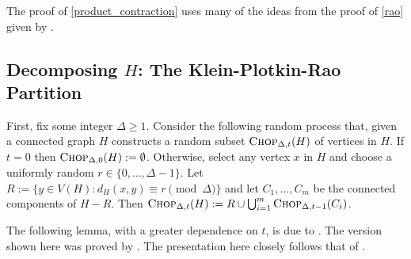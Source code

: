 \documentclass{patmorin}
\renewcommand{\ge}{\geqslant}
\newcommand{\david}[1]{{\color{orange} David: #1}}
\begin{document}

The proof of \cref{product_contraction} uses many of the ideas from the proof of \cref{rao} given by \citet{rao:small}.







\subsection{Decomposing $H$: The Klein-Plotkin-Rao Partition}

First, fix some integer $\Delta \ge 1$.
Consider the following random process that, given a connected graph $H$ constructs a random subset $\textsc{Chop}_{\Delta,t}(H)$ of vertices in $H$. If $t=0$ then $\textsc{Chop}_{\Delta,0}(H):=\emptyset$.  Otherwise, select any vertex $x$ in $H$ and choose a uniformly random $r\in\{0,\ldots,\Delta-1\}$.  Let $R:=\{y\in V(H):d_{H}(x,y)\equiv r\pmod{\Delta}\}$ and let $C_1,\ldots,C_m$ be the connected components of $H-R$.  Then $\textsc{Chop}_{\Delta,t}(H):=R\cup\bigcup_{i=1}^m \textsc{Chop}_{\Delta,t-1}(C_i)$.


The following lemma, with a greater dependence on $t$, is due to \citet{klein.plotkin.ea:excluded}. The version shown here was proved by \citet{fakcharoenphol.talwar:improved}. The presentation here closely follows that of \citet{lee:simpler}.
\end{document}
